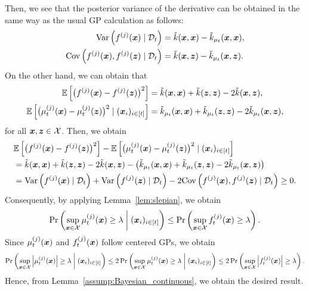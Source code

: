Then, we see that the posterior variance of the derivative can be obtained in the same way as the usual GP calculation as follows:
\begin{align*}
    {\rm Var}\left( f^{(j)}(\boldsymbol{x}) \mid {\cal D}_{t} \right) &= \tilde{k}(\boldsymbol{x}, \boldsymbol{x}) - \tilde{k}_{\mu_t}(\boldsymbol{x}, \boldsymbol{x}), \\
    {\rm Cov}\left( f^{(j)}(\boldsymbol{x}), f^{(j)}(\boldsymbol{z}) \mid {\cal D}_{t} \right) &= \tilde{k}(\boldsymbol{x}, \boldsymbol{z}) - \tilde{k}_{\mu_t}(\boldsymbol{x}, \boldsymbol{z}).
\end{align*}
%
On the other hand, we can obtain that
\begin{align*}
    \mathbb{E}\left[ \bigl( f^{(j)}(\boldsymbol{x}) - f^{(j)}(\boldsymbol{z}) \bigr)^2 \right] &= \tilde{k}(\boldsymbol{x}, \boldsymbol{x}) + \tilde{k}(\boldsymbol{z}, \boldsymbol{z}) - 2\tilde{k}(\boldsymbol{x}, \boldsymbol{z}), \\
    \mathbb{E}\left[ \bigl( \mu_t^{(j)}(\boldsymbol{x}) - \mu_t^{(j)}(\boldsymbol{z}) \bigr)^2 \mid (\boldsymbol{x}_i)_{i \in [t]} \right] &= \tilde{k}_{\mu_t}(\boldsymbol{x}, \boldsymbol{x}) + \tilde{k}_{\mu_t}(\boldsymbol{z}, \boldsymbol{z}) - 2\tilde{k}_{\mu_t}(\boldsymbol{x}, \boldsymbol{z}),
\end{align*}
for all $\boldsymbol{x}, \boldsymbol{z} \in {\cal X}$.
%
Then, we obtain
\begin{align*}
    &\mathbb{E}\left[ \bigl( f^{(j)}(\boldsymbol{x}) - f^{(j)}(\boldsymbol{z}) \bigr)^2 \right] - \mathbb{E}\left[ \bigl( \mu_t^{(j)}(\boldsymbol{x}) - \mu_t^{(j)}(\boldsymbol{z}) \bigr)^2 \mid (\boldsymbol{x}_i)_{i \in [t]}\right] \\
    &= \tilde{k}(\boldsymbol{x}, \boldsymbol{x}) + \tilde{k}(\boldsymbol{z}, \boldsymbol{z}) - 2\tilde{k}(\boldsymbol{x}, \boldsymbol{z}) - \left( \tilde{k}_{\mu_t}(\boldsymbol{x}, \boldsymbol{x}) + \tilde{k}_{\mu_t}(\boldsymbol{z}, \boldsymbol{z}) - 2\tilde{k}_{\mu_t}(\boldsymbol{x}, \boldsymbol{z}) \right) \\
    &= {\rm Var}\left( f^{(j)}(\boldsymbol{x}) \mid {\cal D}_{t} \right) + {\rm Var}\left( f^{(j)}(\boldsymbol{z}) \mid {\cal D}_{t} \right) - 2 {\rm Cov}\left( f^{(j)}(\boldsymbol{x}), f^{(j)}(\boldsymbol{z}) \mid {\cal D}_t \right)
    \geq 0.
\end{align*}
%
Consequently, by applying Lemma~\ref{lem:slepian}, we obtain
\begin{align*}
    \Pr\left( \sup_{\boldsymbol{x} \in {\cal X}} \mu^{(j)}_t(\boldsymbol{x}) \geq \lambda \biggm\vert (\boldsymbol{x}_i)_{i \in [t]} \right) \leq \Pr\left( \sup_{\boldsymbol{x} \in {\cal X}} f^{(j)}_t(\boldsymbol{x}) \geq \lambda \right).
\end{align*}
%
Since $\mu^{(j)}_t(\boldsymbol{x})$ and $f^{(j)}_t(\boldsymbol{x})$ follow centered GPs, we obtain
\begin{align*}
    \Pr\left( \sup_{\boldsymbol{x} \in {\cal X}} \left| \mu^{(j)}_t(\boldsymbol{x}) \right| \geq \lambda \biggm\vert (\boldsymbol{x}_i)_{i \in [t]} \right) 
    \leq 2 \Pr\left( \sup_{\boldsymbol{x} \in {\cal X}} \mu^{(j)}_t(\boldsymbol{x}) \geq \lambda \biggm\vert (\boldsymbol{x}_i)_{i \in [t]} \right)
    \leq 2 \Pr\left( \sup_{\boldsymbol{x} \in {\cal X}} \left| f^{(j)}_t(\boldsymbol{x}) \right| \geq \lambda \right).
\end{align*}
%
Hence, from Lemma~\ref{assump:Bayesian_continuous}, we obtain the desired result.



